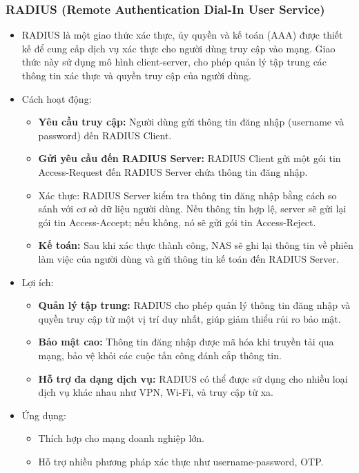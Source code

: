 \subsubsection{RADIUS (Remote Authentication Dial-In User Service)}
\begin{itemize}
    \item RADIUS là một giao thức xác thực, ủy quyền và kế toán (AAA) được thiết kế để cung cấp dịch vụ xác thực cho người dùng truy cập vào mạng. Giao thức này sử dụng mô hình client-server, cho phép quản lý tập trung các thông tin xác thực và quyền truy cập của người dùng.

    \item Cách hoạt động:
    \begin{itemize}
        \item \textbf{Yêu cầu truy cập:} Người dùng gửi thông tin đăng nhập (username và password) đến RADIUS Client.

        \item \textbf{Gửi yêu cầu đến RADIUS Server:} RADIUS Client gửi một gói tin Access-Request đến RADIUS Server chứa thông tin đăng nhập.

        \item Xác thực: RADIUS Server kiểm tra thông tin đăng nhập bằng cách so sánh với cơ sở dữ liệu người dùng. Nếu thông tin hợp lệ, server sẽ gửi lại gói tin Access-Accept; nếu không, nó sẽ gửi gói tin Access-Reject.

        \item \textbf{Kế toán:} Sau khi xác thực thành công, NAS sẽ ghi lại thông tin về phiên làm việc của người dùng và gửi thông tin kế toán đến RADIUS Server.

    \end{itemize}
    \item Lợi ích:
    \begin{itemize}
        \item \textbf{Quản lý tập trung:} RADIUS cho phép quản lý thông tin đăng nhập và quyền truy cập từ một vị trí duy nhất, giúp giảm thiểu rủi ro bảo mật.

        \item \textbf{Bảo mật cao:} Thông tin đăng nhập được mã hóa khi truyền tải qua mạng, bảo vệ khỏi các cuộc tấn công đánh cắp thông tin.

        \item \textbf{Hỗ trợ đa dạng dịch vụ:} RADIUS có thể được sử dụng cho nhiều loại dịch vụ khác nhau như VPN, Wi-Fi, và truy cập từ xa.

    \end{itemize}
    \item Ứng dụng:
    \begin{itemize}
        \item Thích hợp cho mạng doanh nghiệp lớn.

        \item Hỗ trợ nhiều phương pháp xác thực như username-password, OTP.

    \end{itemize}
\end{itemize}

